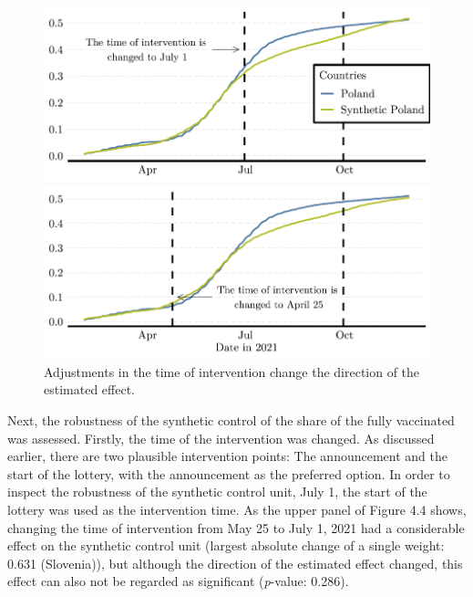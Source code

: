 \documentclass{scrbook}
\begin{document}
\begin{figure}[h]
\caption[Robustness check: Time of intervention]{Adjustments in the time of intervention change the direction of the estimated effect.}

\begin{center}\includegraphics{bachelor_thesis_files/figure-latex/unnamed-chunk-5-1} \end{center}



\begin{center}\includegraphics{bachelor_thesis_files/figure-latex/unnamed-chunk-5-2} \end{center}
\end{figure}

Next, the robustness of the synthetic control of the share of the fully
vaccinated was assessed. Firstly, the time of the intervention was
changed. As discussed earlier, there are two plausible intervention
points: The announcement and the start of the lottery, with the
announcement as the preferred option. In order to inspect the robustness
of the synthetic control unit, July 1, the start of the lottery was used
as the intervention time. As the upper panel of Figure 4.4 shows,
changing the time of intervention from May 25 to July 1, 2021 had a
considerable effect on the synthetic control unit (largest absolute
change of a single weight: 0.631 (Slovenia)), but although the direction
of the estimated effect changed, this effect can also not be regarded as
significant (\textit{p}-value: 0.286).
\end{document}
